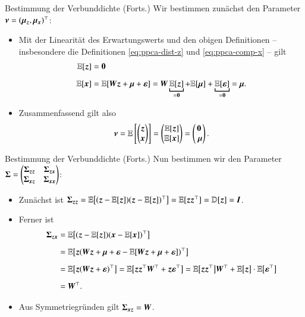 \begin{frame}{Bestimmung der Verbunddichte (Forts.)}{}
	Wir bestimmen zunächst den Parameter $\bm{\nu} = (\bm{\mu}_{\bm{z}}, \bm{\mu}_{\bm{x}})^\top$:
	\begin{itemize}
		\item Mit der Linearität des Erwartungswerts und den obigen Definitionen --
			insbesondere die Definitionen \eqref{eq:ppca-dist-z} und \eqref{eq:ppca-comp-x} -- gilt
		\begin{align*}
			\E[\bz]
				&= \0
		\\[2mm]
			\E[\bx]
				&= \E[\bW \bz + \bmu + \beps]
				= \bW \underbracket{\E[\bz]}_{= \0} + \E[\bmu] + \underbracket{\E[\beps]}_{= \0}
				= \bmu.
		\end{align*}
		\item Zusammenfassend gilt also
		\begin{equation} \label{eq:ppca-expectation-joint-dist}
			\bnu
				= \E\left[ \begin{pmatrix} \bz \\ \bx \end{pmatrix} \right]
				= \begin{pmatrix} \E[\bz] \\ \E[\bx] \end{pmatrix}
				= \begin{pmatrix} \0 \\ \bmu \end{pmatrix}.
		\end{equation}
	\end{itemize}
\end{frame}


\begin{frame}{Bestimmung der Verbunddichte (Forts.)}{}
	Nun bestimmen wir den Parameter
		$\bm{\Sigma} = \begin{pmatrix} \bm{\Sigma}_{\bm{z}\bm{z}} & \bm{\Sigma}_{\bm{z}\bm{x}} \\ \bm{\Sigma}_{\bm{x}\bm{z}} & \bm{\Sigma}_{\bm{x}\bm{x}} \end{pmatrix}$:
	\begin{itemize}
		\item Zunächst ist $\bm{\Sigma}_{\bm{z}\bm{z}} = \mathbb{E}\bigl[ (\bm{z} - \mathbb{E}[\bm{z}]) (\bm{z} - \mathbb{E}[\bm{z}])^\top \bigr] = \mathbb{E}[\bm{z} \bm{z}^\top] = \mathbb{D}[\bm{z}] = \bm{I}$.
		\item Ferner ist
		\begin{align*}
			\bm{\Sigma}_{\bm{z} \bm{x}}
				&= \mathbb{E}\bigl[ (\bm{z} - \mathbb{E}[\bm{z}]) (\bm{x} - \mathbb{E}[\bm{x}])^\top \bigr]
		\\[2mm]
				&= \mathbb{E}\bigl[\bm{z} (\bm{W} \bm{z} + \bm{\mu} + \bm{\varepsilon} - \mathbb{E}[\bm{W} \bm{z} + \bm{\mu} + \bm{\varepsilon}])^\top \bigr]
		\\[2mm]
				&= \mathbb{E}\bigl[\bm{z} (\bm{W} \bm{z} + \bm{\varepsilon})^\top \bigr]
					= \mathbb{E}\bigl[ \bm{z} \bm{z}^\top \bm{W}^\top + \bm{z} \bm{\varepsilon}^\top \bigr]
					= \mathbb{E}\bigl[ \bm{z} \bm{z}^\top \bigr] \bm{W}^\top  + \mathbb{E}\bigl[ \bm{z} \bigr] \cdot \mathbb{E}\bigl[ \bm{\varepsilon}^\top \bigr]
		\\[2mm]
				&= \bm{W}^\top.
		\end{align*}
		\item Aus Symmetriegründen gilt $\bm{\Sigma}_{\bm{x} \bm{z}} = \bm{W}$.
	\end{itemize}
\end{frame}


